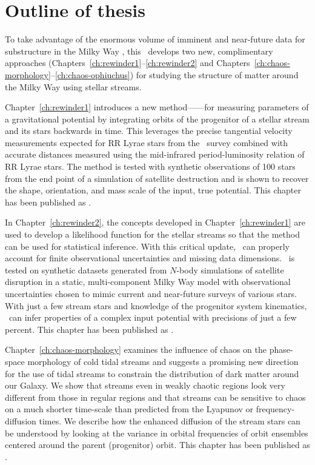 \section{Outline of thesis}

To take advantage of the enormous volume of imminent and near-future data for
substructure in the Milky Way \mwhalo, this \article\ develops two new,
complimentary approaches (Chapters~\ref{ch:rewinder1}--\ref{ch:rewinder2} and
Chapters~\ref{ch:chaos-morphology}--\ref{ch:chaos-ophiuchus}) for studying the
structure of matter around the Milky Way using stellar streams.

Chapter~\ref{ch:rewinder1} introduces a new method---\rewinder---for measuring
parameters of a gravitational potential by integrating orbits of the progenitor
of a stellar stream and its stars backwards in time. This leverages the precise
tangential velocity measurements expected for RR Lyrae stars from the
\gaia\ survey combined with accurate distances measured using the mid-infrared
period-luminosity relation of RR Lyrae stars. The method is tested with
synthetic observations of 100 stars from the end point of a simulation of
satellite destruction and is shown to recover the shape, orientation, and mass
scale of the input, true potential. This chapter has been published as
\citep{apw13}.

In Chapter~\ref{ch:rewinder2}, the concepts developed in
Chapter~\ref{ch:rewinder1} are used to develop a likelihood function for the
stellar streams so that the method can be used for statistical inference. With
this critical update, \rewinder\ can properly account for finite observational
uncertainties and missing data dimensions. \rewinder\ is tested on synthetic
datasets generated from $N$-body simulations of satellite disruption in a
static, multi-component Milky Way model with observational uncertainties chosen
to mimic current and near-future surveys of various stars. With just a few
stream stars and knowledge of the progenitor system kinematics, \rewinder\ can
infer properties of a complex input potential with precisions of just a few
percent. This chapter has been published as \citep{apw14}.

Chapter~\ref{ch:chaos-morphology} examines the influence of chaos on the
phase-space morphology of cold tidal streams and suggests a promising new
direction for the use of tidal streams to constrain the distribution of dark
matter around our Galaxy. We show that streams even in weakly chaotic regions
look very different from those in regular regions and that streams can be
sensitive to chaos on a much shorter time-scale than predicted from the Lyapunov
or frequency-diffusion times. We describe how the enhanced diffusion of the
stream stars can be understood by looking at the variance in orbital frequencies
of orbit ensembles centered around the parent (progenitor) orbit. This chapter
has been published as \citep{apw15-chaos}.

